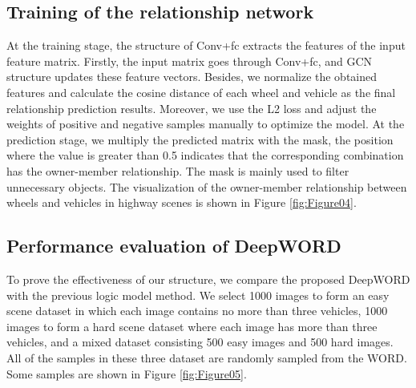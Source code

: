 \documentclass{article}
\begin{document}
\subsection{Training of the relationship network} 

At the training stage, the structure of Conv+fc extracts the features of the input feature matrix. Firstly, the input matrix goes through Conv+fc, and GCN structure updates these feature vectors. Besides, we normalize the obtained features and calculate the cosine distance of each wheel and vehicle as the final relationship prediction results. Moreover, we use the L2 loss and adjust the weights of positive and negative samples manually to optimize the model. At the prediction stage, we multiply the predicted matrix with the mask, the position where the value is greater than 0.5 indicates that the corresponding combination has the owner-member relationship. The mask is mainly used to filter unnecessary objects. The visualization of the owner-member relationship between wheels and vehicles in highway scenes is shown in Figure \ref{fig:Figure04}.





\subsection{Performance evaluation of DeepWORD}

To prove the effectiveness of our structure, we compare the proposed DeepWORD with the previous logic model method. We select 1000 images to form an easy scene dataset in which each image contains no more than three vehicles, 1000 images to form a hard scene dataset where each image has more than three vehicles, and a mixed dataset consisting 500 easy images and 500 hard images. All of the samples in these three dataset are randomly sampled from the WORD. Some samples are shown in Figure \ref{fig:Figure05}. 
% 
\end{document}
